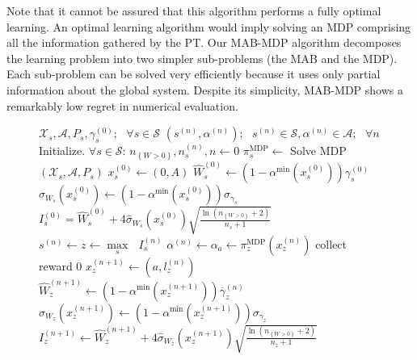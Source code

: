 Note that it cannot be assured that this algorithm performs a fully optimal learning. An optimal learning algorithm would imply solving an MDP comprising all the information gathered by the PT. Our MAB-MDP algorithm decomposes the learning problem into two simpler sub-problems (the MAB and the MDP). Each sub-problem can be solved very efficiently because it uses only partial information about the global system. Despite its simplicity, MAB-MDP shows a remarkably low regret in numerical evaluation.
\renewcommand{\algorithmicrequire}{\textbf{Input:}}
\renewcommand{\algorithmicensure}{\textbf{Output:}}
\begin{figure}
\begin{algorithmic}[1]
  \REQUIRE $\mathcal{X}_s,\mathcal{A},P_s,\gamma_s^{(0)};\text{ } \forall s \in \mathcal{S}$
  \ENSURE $(s^{(n)},\alpha^{(n)});\text{ } s^{(n)} \in \mathcal{S}, \alpha^{(n)} \in \mathcal{A};\text{ } \forall n$
  \STATE Initialize. $\forall s \in \mathcal{S}$: 
    \STATE\hspace{\algorithmicindent}$n_{\left\{W>0\right\}}, n_s^{(n)}, n \leftarrow 0$
    \STATE\hspace{\algorithmicindent}$\pi_s^{\text{MDP}} \leftarrow$ Solve MDP $(\mathcal{X}_s,\mathcal{A},P_s)$
    \STATE\hspace{\algorithmicindent}$x_s^{(0)} \leftarrow (0,A)$
    \STATE\hspace{\algorithmicindent}$\widehat{W}_s^{(0)}\leftarrow (1-\alpha^{\text{min}}(x_s^{(0)}))\gamma_s^{(0)}$ 
    \STATE\hspace{\algorithmicindent}$\hat\sigma_{W_s}(x_s^{(0)}) \leftarrow (1-\alpha^{\text{min}}(x_s^{(0)}))\sigma_{\gamma_s}$
    \STATE\hspace{\algorithmicindent}$I_{s}^{(0)} = \widehat{W}^{(0)}_s + 4 \hat\sigma_{W_{s}}(x_s^{(0)})\sqrt{\frac{\ln(n_{\left\{W>0\right\}} + 2)}{n_s+1}}$
  \LOOP
    \STATE $s^{(n)} \leftarrow z \leftarrow \underset{s}\max\text{ }I_s^{(n)}$
    \STATE $\alpha^{(n)} \leftarrow \alpha_a \leftarrow \pi_z^{\text{MDP}}(x_z^{(n)})$\renewcommand{\algorithmicensure}{\textbf{Output:}}
      \STATE collect reward  $0$
      \STATE $x_z^{(n+1)} \leftarrow (a,l_z^{(n)})$ 
      \STATE $\widehat{W}_z^{(n+1)}\leftarrow (1-\alpha^{\text{min}}(x_z^{(n+1)}))\overline{\gamma}_z^{(n)}$
      \STATE $\hat\sigma_{W_z}(x_z^{(n+1)}) \leftarrow (1-\alpha^{\text{min}}(x_z^{(n+1)}))\sigma_{\gamma_z}$
      \STATE $I_{z}^{(n+1)} \leftarrow \widehat{W}_z^{(n+1)} + 4\hat\sigma_{W_z}(x_z^{(n+1)}) \sqrt{\frac{\ln(n_{\left\{W>0\right\}} + 2)}{n_z+1}}$ 

\end{algorithmic}
\end{figure}
